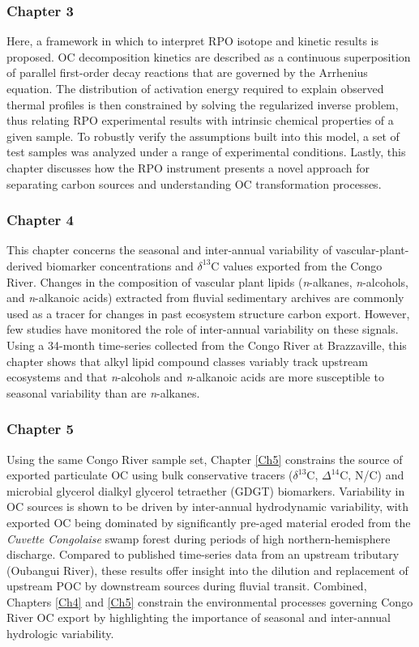 \subsubsection{Chapter 3}

Here, a framework in which to interpret RPO isotope and kinetic results is proposed. OC decomposition kinetics are described as a continuous superposition of parallel first-order decay reactions that are governed by the Arrhenius equation. The distribution of activation energy required to explain observed thermal profiles is then constrained by solving the regularized inverse problem, thus relating RPO experimental results with intrinsic chemical properties of a given sample. To robustly verify the assumptions built into this model, a set of test samples was analyzed under a range of experimental conditions. Lastly, this chapter discusses how the RPO instrument presents a novel approach for separating carbon sources and understanding OC transformation processes.

\subsubsection{Chapter 4}

This chapter concerns the seasonal and inter-annual variability of vascular-plant-derived biomarker concentrations and $\delta^{13}$C values exported from the Congo River. Changes in the composition of vascular plant lipids (\textit{n}-alkanes, \textit{n}-alcohols, and \textit{n}-alkanoic acids) extracted from fluvial sedimentary archives are commonly used as a tracer for changes in past ecosystem structure carbon export. However, few studies have monitored the role of inter-annual variability on these signals. Using a 34-month time-series collected from the Congo River at Brazzaville, this chapter shows that alkyl lipid compound classes variably track upstream ecosystems and that \textit{n}-alcohols and \textit{n}-alkanoic acids are more susceptible to seasonal variability than are \textit{n}-alkanes. 

\subsubsection{Chapter 5}

Using the same Congo River sample set, Chapter \ref{Ch5} constrains the source of exported particulate OC using bulk conservative tracers ($\delta^{13}$C, $\Delta^{14}$C, N/C) and microbial glycerol dialkyl glycerol tetraether (GDGT) biomarkers. Variability in OC sources is shown to be driven by inter-annual hydrodynamic variability, with exported OC being dominated by significantly pre-aged material eroded from the \textit{Cuvette Congolaise} swamp forest during periods of high northern-hemisphere discharge. Compared to published time-series data from an upstream tributary (Oubangui River), these results offer insight into the dilution and replacement of upstream POC by downstream sources during fluvial transit. Combined, Chapters \ref{Ch4} and \ref{Ch5} constrain the environmental processes governing Congo River OC export by highlighting the importance of seasonal and inter-annual hydrologic variability.

